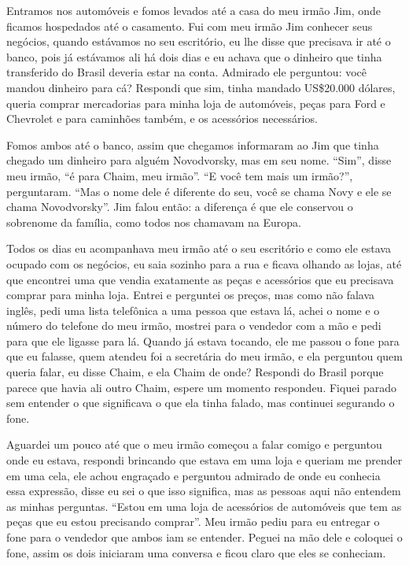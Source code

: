 Entramos nos automóveis e fomos levados até a casa do meu irmão Jim,
onde ficamos hospedados até o casamento. Fui com meu irmão Jim conhecer
seus negócios, quando estávamos no seu escritório, eu lhe disse que
precisava ir até o banco, pois já estávamos ali há dois dias e eu achava
que o dinheiro que tinha transferido do Brasil deveria estar na conta.
Admirado ele perguntou: você mandou dinheiro para cá? Respondi que sim,
tinha mandado US\$20.000 dólares, queria comprar mercadorias para minha
loja de automóveis, peças para Ford e Chevrolet e para caminhões também,
e os acessórios necessários.

Fomos ambos até o banco, assim que chegamos informaram ao Jim que tinha
chegado um dinheiro para alguém Novodvorsky, mas em seu nome. ``Sim'',
disse meu irmão, ``é para Chaim, meu irmão''. ``E você tem mais um
irmão?'', perguntaram. ``Mas o nome dele é diferente do seu, você se
chama Novy e ele se chama Novodvorsky''. Jim falou então: a diferença é
que ele conservou o sobrenome da família, como todos nos chamavam na
Europa.

Todos os dias eu acompanhava meu irmão até o seu escritório e como ele
estava ocupado com os negócios, eu saia sozinho para a rua e ficava
olhando as lojas, até que encontrei uma que vendia exatamente as peças e
acessórios que eu precisava comprar para minha loja. Entrei e perguntei
os preços, mas como não falava inglês, pedi uma lista telefônica a uma
pessoa que estava lá, achei o nome e o número do telefone do meu irmão,
mostrei para o vendedor com a mão e pedi para que ele ligasse para lá.
Quando já estava tocando, ele me passou o fone para que eu falasse, quem
atendeu foi a secretária do meu irmão, e ela perguntou quem queria
falar, eu disse Chaim, e ela Chaim de onde? Respondi do Brasil porque
parece que havia ali outro Chaim, espere um momento respondeu. Fiquei
parado sem entender o que significava o que ela tinha falado, mas
continuei segurando o fone.

Aguardei um pouco até que o meu irmão começou a falar comigo e perguntou
onde eu estava, respondi brincando que estava em uma loja e queriam me
prender em uma cela, ele achou engraçado e perguntou admirado de onde eu
conhecia essa expressão, disse eu sei o que isso significa, mas as
pessoas aqui não entendem as minhas perguntas. ``Estou em uma loja de
acessórios de automóveis que tem as peças que eu estou precisando
comprar''. Meu irmão pediu para eu entregar o fone para o vendedor que
ambos iam se entender. Peguei na mão dele e coloquei o fone, assim os
dois iniciaram uma conversa e ficou claro que eles se conheciam.

